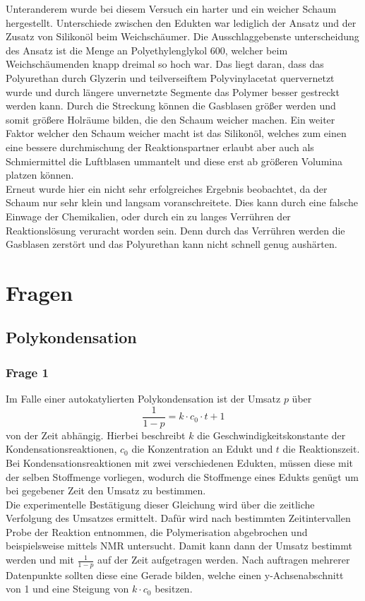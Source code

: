 \documentclass[10pt,a4paper,ngerman]{scrartcl}
\begin{document}
		Unteranderem wurde bei diesem Versuch ein harter und ein weicher Schaum hergestellt. Unterschiede zwischen den Edukten war lediglich der Ansatz und der Zusatz 
		von Silikonöl beim Weichschäumer. Die Ausschlaggebenste unterscheidung des Ansatz ist die Menge an Polyethylenglykol 600, welcher beim Weichschäumenden knapp 
		dreimal so hoch war. Das liegt daran, dass das Polyurethan durch Glyzerin und teilverseiftem Polyvinylacetat quervernetzt wurde und durch längere unvernetzte 
		Segmente das Polymer besser gestreckt werden kann. Durch die Streckung können die Gasblasen größer werden und somit größere Holräume bilden, die den Schaum weicher 
		machen. Ein weiter Faktor welcher den Schaum weicher macht ist das Silikonöl, welches zum einen eine bessere durchmischung der Reaktionspartner erlaubt aber auch 
		als Schmiermittel die Luftblasen ummantelt und diese erst ab größeren Volumina platzen können.\\
		Erneut wurde hier ein nicht sehr erfolgreiches Ergebnis beobachtet, da der Schaum nur sehr klein und langsam voranschreitete. Dies kann durch eine falsche 
		Einwage der Chemikalien, oder durch ein zu langes Verrühren der Reaktionslösung veruracht worden sein. Denn durch das Verrühren werden die Gasblasen zerstört und 
		das Polyurethan kann nicht schnell genug aushärten.


\section{Fragen}
	
	\subsection{Polykondensation}
	
		\subsubsection{Frage 1}

			Im Falle einer autokatylierten Polykondensation ist der Umsatz $p$ über 
			\begin{equation}
				\frac{1}{1-p} = k \cdot c_0 \cdot t + 1 
			\end{equation}
			von der Zeit abhängig. Hierbei beschreibt $k$ die Geschwindigkeitskonstante der Kondensationsreaktionen, $c_0$ die Konzentration an Edukt und $t$ die 
			Reaktionszeit. Bei Kondensationsreaktionen mit zwei verschiedenen Edukten, müssen diese mit der selben Stoffmenge vorliegen, wodurch die Stoffmenge eines
			Edukts genügt um bei gegebener Zeit den Umsatz zu bestimmen. \cite{polyskript}\\
			Die experimentelle Bestätigung dieser Gleichung wird über die zeitliche Verfolgung des Umsatzes ermittelt. Dafür wird nach bestimmten Zeitintervallen Probe 
			der Reaktion entnommen, die Polymerisation abgebrochen und beispielsweise mittels NMR untersucht. Damit kann dann der Umsatz bestimmt werden und mit 
			$\frac{1}{1-p}$ auf der Zeit aufgetragen werden. Nach auftragen mehrerer Datenpunkte sollten diese eine Gerade bilden, welche einen y-Achsenabschnitt von 1
			und eine Steigung von $k \cdot c_0$ besitzen.  
\end{document}
